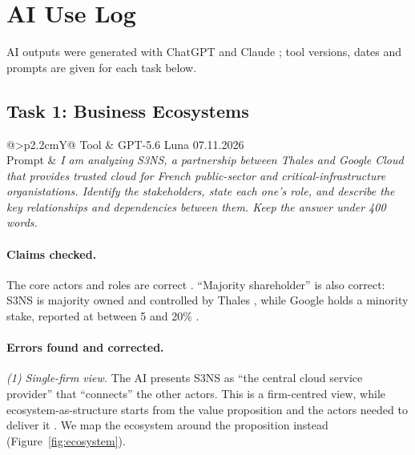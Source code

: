 \section{AI Use Log}
\label{app:ailog}

\newcommand{\aiprompt}[2]{%
  \par\noindent
  \begin{tabularx}{\linewidth}{@{}>{\bfseries}p{2.2cm}Y@{}}
    \toprule
    Tool   & #1 \\
    Prompt & \itshape #2 \\
    \bottomrule
  \end{tabularx}\par\medskip}

AI outputs were generated with ChatGPT \parencite{openai2026} and Claude \parencite{anthropic2026}; tool versions, dates and prompts are given for each task below.

\subsection{Task 1: Business Ecosystems}

\aiprompt{GPT-5.6 Luna 07.11.2026} {I am analyzing S3NS, a partnership between Thales and
Google Cloud that provides trusted cloud for French public-sector and
critical-infrastructure organistations. Identify the stakeholders, state each
one's role, and describe the key relationships and dependencies between them.
Keep the answer under 400 words.}

\paragraph{Claims checked.}
The core actors and roles are correct \parencite{s3ns2025premi3ns}.
``Majority shareholder'' is also correct: S3NS is majority owned and controlled
by Thales \parencite{thales2022}, while Google holds a minority stake, reported at between 5 and 20\%
\parencite{alenatec2026, futurum2026}.

\paragraph{Errors found and corrected.}
\textit{(1) Single-firm view.} The AI presents S3NS as ``the central cloud
service provider'' that ``connects'' the other actors. This is a firm-centred
view, while ecosystem-as-structure starts from the value proposition and the
actors needed to deliver it \parencites{adner2017}[slides~8--13]{windekilde2026ecosystem}.
We map the ecosystem around the proposition instead (Figure~\ref{fig:ecosystem}).

